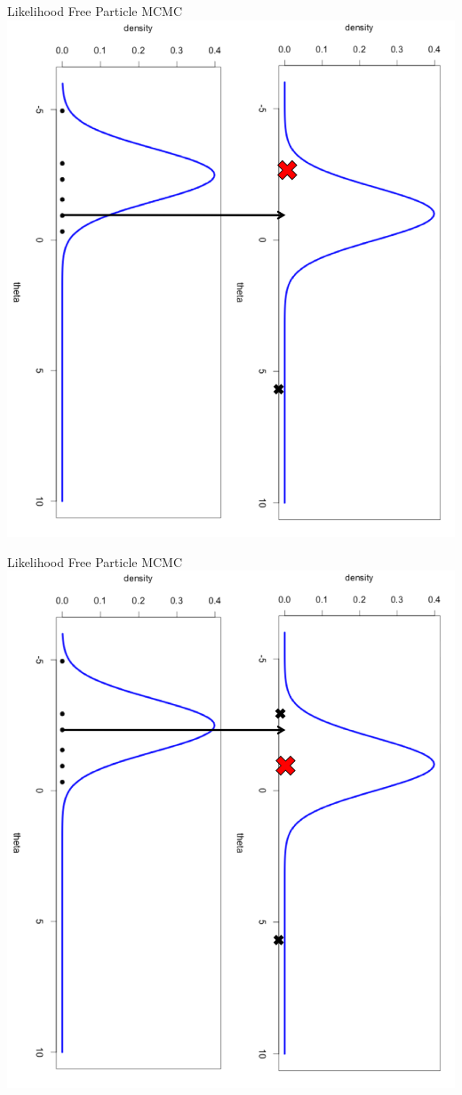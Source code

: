 \documentclass[12pt,a4paper,t,xcolor=dvipsnames,slidestop,compress,mathserif]{beamer}
\begin{document}
\begin{frame}{Likelihood Free Particle MCMC}
\includegraphics[scale=0.35]{post_sample2_graphic.png}
\end{frame}
\begin{frame}{Likelihood Free Particle MCMC}
\includegraphics[scale=0.35]{post_sample3_graphic.png}
\end{frame}
\end{document}
